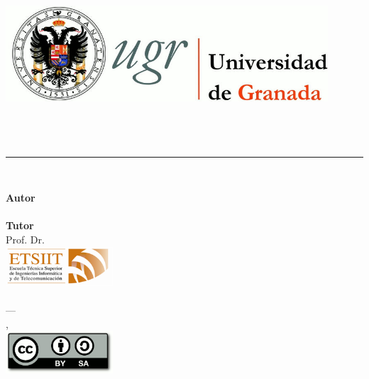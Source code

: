 \begin{titlepage}
 
\newlength{\centeroffset}
\setlength{\centeroffset}{-0.5\oddsidemargin}
\addtolength{\centeroffset}{0.5\evensidemargin}

\noindent\hspace*{\centeroffset}\begin{minipage}{\textwidth}

\centering
\includegraphics[width=0.9\textwidth]{../images/logo_ugr.jpg}\\[1.4cm]

\textsc{\Large\mySubject\\[0.2cm]}
\textsc{\myDegree}\\[1cm]

{\Huge\bfseries \myTitle\\}
\noindent\rule[-1ex]{\textwidth}{3pt}\\[3.5ex]
{\large\bfseries \mySubtitle}
\end{minipage}

\vspace{2.5cm}
\noindent\hspace*{\centeroffset}\begin{minipage}{\textwidth}
\centering

\textbf{Autor}\\ {\myName}\\[2.5ex]
\textbf{Tutor}\\ {Prof. Dr. \myProf}\\[2cm]
\includegraphics[width=0.3\textwidth]{../images/etsiit_logo.png}\\[0.1cm]
\textsc{\myFaculty}\\
\textsc{---}\\
\myLocation, \myTime\\
\includegraphics[width=0.3\textwidth]{../images/CC-SA-logo.png}
\end{minipage}
\end{titlepage}



